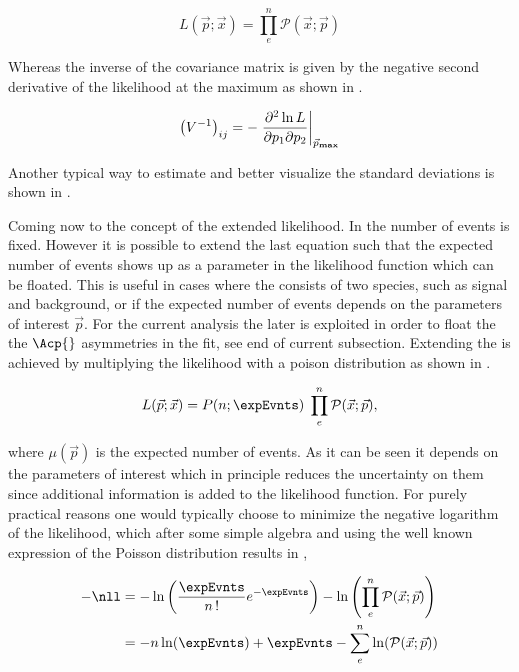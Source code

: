 \begin{equation}
L(\vec{p};\vec{x}) = \prod_e^n \mathcal{P}(\vec{x};\vec{p})
\label{likelihood}
\end{equation}

\noindent Whereas the inverse of the covariance matrix is given by the negative second derivative of the likelihood at the maximum as shown in .

\begin{equation}
\left( V^{-1} \right)_{ij} = - \left. \frac{\partial^2\ln L}{\partial p_1 \partial p_2} \right|_{ \vec{p}_{\rm\bf max}}
\label{covariance}
\end{equation}

\noindent Another typical way to estimate and better visualize the standard deviations is shown in . 

Coming now to the concept of the extended likelihood. In  the number of events is fixed. However it is possible to 
extend the last equation such that the expected number of events shows up as a parameter in the likelihood function which can be floated. 
This is useful in cases where the \pdf consists of two species, such as signal and background, or if the expected number of events depends on the 
parameters of interest $\vec{p}$. For the current analysis the later is exploited in order to float the the $\Acp{}$ asymmetries in the fit,
see end of current subsection. Extending the \pdf is achieved by multiplying the likelihood with a poison distribution as shown in .

\begin{equation}
L(\vec{p};\vec{x}) = P(n;\expEvnts) \; \prod_e^n \mathcal{P}(\vec{x};\vec{p}),
\label{extlikelihood}
\end{equation}

\noindent where $\mu(\vec{p})$ is the expected number of events. As it can be seen it depends on the parameters of interest which in 
principle reduces the uncertainty on them since additional information is added to the likelihood function.
For purely practical reasons one would typically choose to minimize the negative logarithm of the likelihood, which after some simple
algebra and using the well known expression of the Poisson distribution results in ,

\begin{align}
  -\nll &= -\ln\left( \frac{\expEvnts}{n\,!} e^{-\expEvnts } \right) - \ln\left( \prod_e^n \mathcal{P}(\vec{x};\vec{p}) \right)  \nonumber \\
        &= - n\ln(\expEvnts) + \expEvnts - \sum_e^n \ln( \mathcal{P}(\vec{x};\vec{p}) )
\label{extloglikelihood}
\end{align}

